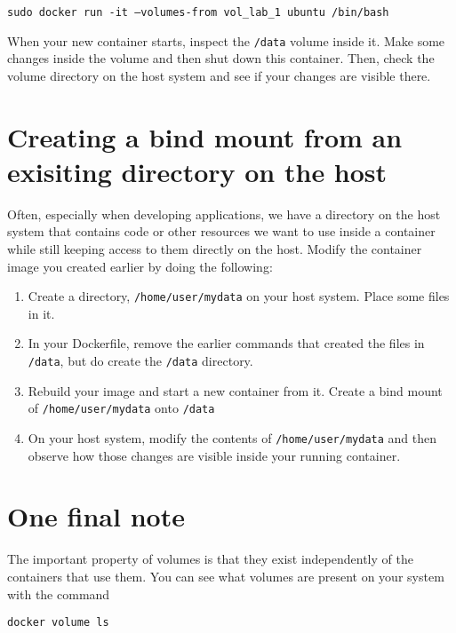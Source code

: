 \documentclass{article}
\begin{document}
\texttt{sudo docker run -it  --volumes-from vol\_lab\_1 ubuntu /bin/bash}

When your new container starts, inspect the \texttt{/data} volume inside it.  Make some changes inside the volume and then shut down this container.  Then, check the volume directory on the host system and see if your changes are visible there.

\section{Creating a bind mount from an exisiting directory on the host}
Often, especially when developing applications, we have a directory on the host system that contains code or other resources we want to use inside a container while still keeping access to them directly on the host. Modify the container image you created earlier by doing the following:

\begin{enumerate}
	\item Create a directory, \texttt{/home/user/mydata} on your host system. Place some files in it.
	\item In your Dockerfile, remove the earlier commands that created the files in \texttt{/data}, but do create the \texttt{/data} directory.
	\item Rebuild your image and start a new container from it. Create a bind mount of \texttt{/home/user/mydata} onto \texttt{/data}
	\item On your host system, modify the contents of \texttt{/home/user/mydata} and then observe how those changes are visible inside your running container.
\end{enumerate}

\section{One final note}
The important property of volumes is that they exist independently of the containers that use them. You can see what volumes are present on your system with the command

\texttt{docker volume ls}
\end{document}
